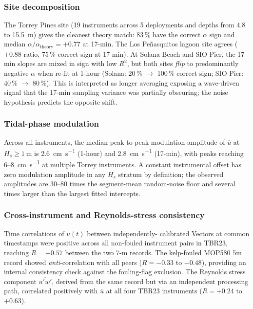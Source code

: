 
\subsubsection{Site decomposition}
The Torrey Pines site (19 instruments across 5 deployments and
depths from 4.8 to 15.5~m) gives the cleanest theory match: 83\,\%
have the correct $\alpha$ sign and median $\alpha/\alpha_\text{theory}
= +0.77$ at 17-min. The Los Pe\~nasquitos lagoon site agrees
($+0.88$ ratio, 75\,\% correct sign at 17-min). At Solana Beach
and SIO Pier, the 17-min slopes are mixed in sign with low $R^2$,
but both sites \emph{flip} to predominantly negative $\alpha$ when
re-fit at 1-hour (Solana: 20\,\% $\to$ 100\,\% correct sign;
SIO Pier: 40\,\% $\to$ 80\,\%). This is interpreted as longer
averaging exposing a wave-driven signal that the 17-min sampling
variance was partially obscuring; the noise hypothesis predicts
the opposite shift.

\subsubsection{Tidal-phase modulation}
Across all instruments, the median peak-to-peak modulation
amplitude of $\overline{u}$ at $H_s \geq \SI{1}{\meter}$ is
\SI{2.6}{\centi\meter\per\second} (1-hour) and
\SI{2.8}{\centi\meter\per\second} (17-min), with peaks reaching
6--\SI{8}{\centi\meter\per\second} at multiple Torrey instruments.
A constant instrumental offset has zero modulation amplitude in
any $H_s$ stratum by definition; the observed amplitudes are 30--80
times the segment-mean random-noise floor and several times larger
than the largest fitted intercepts.

\subsubsection{Cross-instrument and Reynolds-stress consistency}
Time correlations of $\overline{u}(t)$ between independently-
calibrated Vectors at common timestamps were positive across all
non-fouled instrument pairs in TBR23, reaching $R = +0.57$ between
the two 7-m records. The kelp-fouled MOP580 5m record showed
\emph{anti}-correlation with all peers ($R = -0.33$ to $-0.48$),
providing an internal consistency check against the
fouling-flag exclusion. The Reynolds stress component
$\overline{u'w'}$, derived from the same record but via an
independent processing path, correlated positively with
$\overline{u}$ at all four TBR23 instruments
($R = +0.24$ to $+0.63$).


